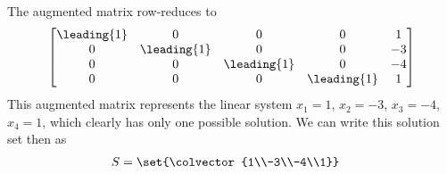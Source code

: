 The augmented matrix row-reduces to
%
\begin{equation*}
\begin{bmatrix}
\leading{1} &  0 &  0 &  0 &  1\\ 
0 &  \leading{1} &  0 &  0 &  -3\\ 
0 &  0 &  \leading{1} &  0 &  -4\\ 
0 &  0 &  0 &  \leading{1} &  1
\end{bmatrix}
\end{equation*}
%
This augmented matrix represents the linear system $x_1=1$, $x_2=-3$, $x_3=-4$, $x_4=1$, which clearly has only one possible solution.  We can write this solution set then as
%
\begin{align*}
S&=\set{\colvector{1\\-3\\-4\\1}}
\end{align*}
%
